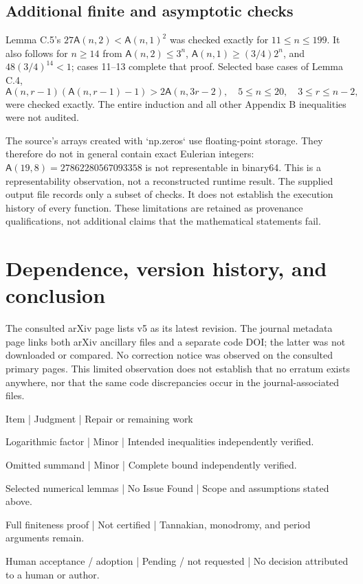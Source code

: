 \documentclass[10pt]{article}
\begin{document}
\subsection*{Additional finite and asymptotic checks}
Lemma C.5’s \(27\mathsf A(n,2)<\mathsf A(n,1)^2\) was checked exactly for \(11\leq n\leq199\). It also follows for \(n\geq14\) from \(\mathsf A(n,2)\leq3^n\), \(\mathsf A(n,1)\geq(3/4)2^n\), and \(48(3/4)^{14}<1\); cases 11–13 complete that proof. Selected base cases of Lemma C.4, \[\mathsf A(n,r-1)(\mathsf A(n,r-1)-1)>2\mathsf A(n,3r-2),
 \quad 5\leq n\leq20,\quad3\leq r\leq n-2,\] were checked exactly. The entire induction and all other Appendix B inequalities were not audited.\par
The source’s arrays created with `np.zeros` use floating-point storage. They therefore do not in general contain exact Eulerian integers: \(\mathsf A(19,8)=27862280567093358\) is not representable in binary64. This is a representability observation, not a reconstructed runtime result. The supplied output file records only a subset of checks. It does not establish the execution history of every function. These limitations are retained as provenance qualifications, not additional claims that the mathematical statements fail.\par
\section*{Dependence, version history, and conclusion}
The consulted arXiv page lists v5 as its latest revision. The journal metadata page links both arXiv ancillary files and a separate code DOI; the latter was not downloaded or compared. No correction notice was observed on the consulted primary pages. This limited observation does not establish that no erratum exists anywhere, nor that the same code discrepancies occur in the journal-associated files.\par
Item | Judgment | Repair or remaining work\par
Logarithmic factor | Minor | Intended inequalities independently verified.\par
Omitted summand | Minor | Complete bound independently verified.\par
Selected numerical lemmas | No Issue Found | Scope and assumptions stated above.\par
Full finiteness proof | Not certified | Tannakian, monodromy, and period arguments remain.\par
Human acceptance / adoption | Pending / not requested | No decision attributed to a human or author.\par
\end{document}
